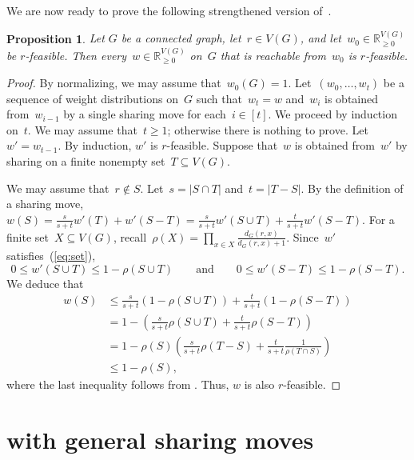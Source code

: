 \documentclass[reqno, 12pt]{amsart}
\numberwithin{equation}{section}
\numberwithin{figure}{section}
\theoremstyle{plain}
\newtheorem{proposition}[thm]{Proposition}
\theoremstyle{definition}
\newcommand*{\abs}[1]{\ensuremath{{\left\lvert {#1} \right\rvert}}}
\newcommand*{\weights}{\ensuremath{\mathbb{R}_{\geq 0}^{V(G)}}}
\begin{document}
We are now ready to prove the following strengthened version of~.
 

\begin{proposition}
    \label{prop:mainstrong}
    Let $G$ be a connected graph, let~${r \in V(G)}$, and let~${w_0 \in \weights}$ be $r$-feasible.  
    Then every~${w \in \weights}$ on~$G$ that is reachable from~$w_0$ is $r$-feasible. 
\end{proposition}

\begin{proof}
    By normalizing, we may assume that~${w_0(G) = 1}$. 
    Let~${(w_0, \dots, w_t)}$ be a sequence of weight distributions on~$G$ such that~${w_t = w}$ and~$w_i$ is obtained from~$w_{i-1}$ by a single sharing move for each~${i \in [t]}$. 
    We proceed by induction on~$t$. 
    We may assume that~${t \geq 1}$; 
    otherwise there is nothing to prove. 
    Let~${w' = w_{t-1}}$. 
    By induction, $w'$ is $r$-feasible. 
    Suppose that~$w$ is obtained from~$w'$ by sharing on a finite nonempty set~${T \subseteq V(G)}$. 
    
    We may assume that~${r \notin S}$. 
    Let~${s = \abs{S \cap T}}$ and~${t = \abs{T-S}}$. 
    By the definition of a sharing move, 
    \(
        {w(S) 
            = \frac{s}{s+t} w'(T) + w'(S-T) 
            = \frac{s}{s+t} w'(S\cup T) + \frac{t}{s+t} w'(S-T)}
    \). 
    For a finite set~${X \subseteq V(G)}$, recall~${\rho(X)=\prod_{x \in X} \frac{d_G(r,x)}{d_G(r,x)+1}}$. 
    Since~$w'$ satisfies~(\ref{eq:set}), 
    \[
        0 \leq w'(S\cup T) \leq 1 - \rho(S \cup T)
        \qquad\text{and}\qquad 
        0 \leq w'(S-T) \leq 1 - \rho(S-T). 
    \]
    We deduce that 
    \begin{align*}
        w(S)
        &\leq \frac{s}{s+t} \left( 1 - \rho(S \cup T) \right) + \frac{t}{s+t} \left( 1 - \rho(S-T) \right) \\
        &= 1 - \left( \frac{s}{s+t} \rho(S \cup T) + \frac{t}{s+t} \rho(S-T) \right) \\ 
        &= 1 - \rho(S) \left( \frac{s}{s+t} \rho(T-S) + \frac{t}{s+t} \frac{1}{\rho(T \cap S)} \right)\\
        &\leq 1 - \rho(S), 
    \end{align*}
    where the last inequality follows from . 
    Thus, $w$ is also $r$-feasible.  
\end{proof}

\section{\texorpdfstring
{ with general sharing moves}
{Lemma 3.4 with general sharing moves}}
\label{sec:appendix2}
\end{document}
